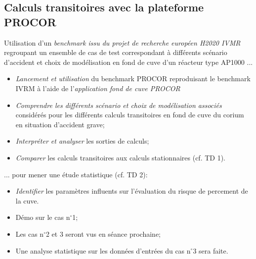 \subsection{Calculs transitoires avec la plateforme PROCOR}
\begin{frame}[fragile]
	Utilisation d'un \emph{benchmark issu du projet de recherche européen H2020 IVMR} regroupant un ensemble de cas de test correspondant à différents scénario d'accident et choix de modélisation en fond de cuve d'un réacteur type AP1000 ...
	\begin{itemize}
	\item \emph{Lancement et utilisation} du benchmark PROCOR reproduisant le benchmark IVRM à l'aide de l'\emph{application fond de cuve PROCOR}
	\item \emph{Comprendre les différents scénario et choix de modélisation associés} considérés pour les différents calculs transitoires en fond de cuve du corium en situation d'accident grave;
	\item \emph{Interpréter et analyser} les sorties de calculs;
	\item \emph{Comparer} les calculs transitoires aux calculs stationnaires (cf. TD 1).
	\end{itemize}
	... pour mener une étude statistique (cf. TD 2):
	\begin{itemize}
	\item \emph{Identifier} les paramètres influents sur l'évaluation du risque de percement de la cuve.
	\end{itemize}
\end{frame}
\begin{frame}[fragile]
\begin{itemize}
\item Démo sur le cas n$^{\circ}$1;
\item Les cas n$^{\circ}$2 et 3 seront vus en séance prochaine;
\item Une analyse statistique sur les données d'entrées du cas n$^{\circ}$3 sera faite.
\end{itemize}
\end{frame}
